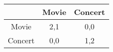 \begin{tabular}[12pt]{ |c| c| c|} 
    \hline
    & Movie & Concert \\ 
    \hline
    Movie & 2,1 & 0,0  \\
    \hline 
    Concert & 0,0 & 1,2  \\
    \hline
    \end{tabular}